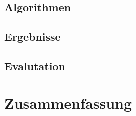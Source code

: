 \documentclass[a4paper, abstracton, DIV=calc]{scrreprt}
\begin{document}
\section{Algorithmen}
\section{Ergebnisse}
\section{Evalutation}

\chapter{Zusammenfassung}

\nocite{*}


\clearpage
{}

\end{document}
